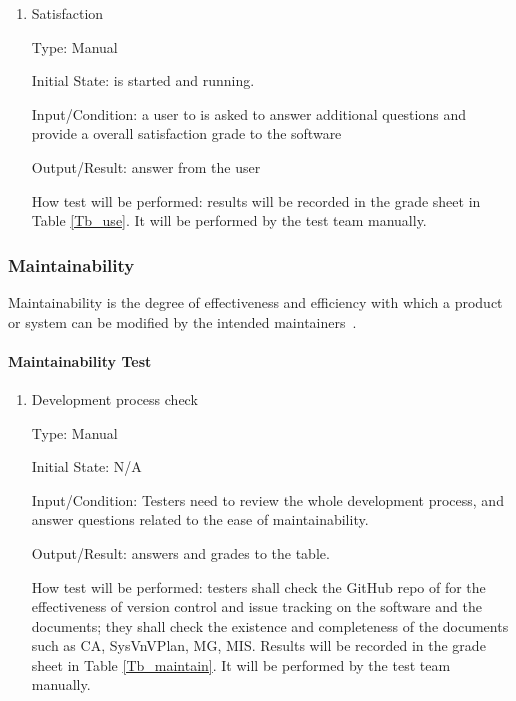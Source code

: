 \documentclass[12pt, titlepage]{article}
\begin{document}
\begin{enumerate}
\item{Satisfaction}

Type: Manual
					
Initial State: \progname{} is started and running.
					
Input/Condition: a user to \progname{} is asked to answer additional questions and provide a overall satisfaction grade to the software 
					
Output/Result: answer from the user
					
How test will be performed: results will be recorded in the grade sheet in Table \ref{Tb_use}. It will be performed by the test team manually.

\end{enumerate}

\subsubsection{Maintainability}
\label{sec_Maintaintest}
Maintainability is the degree of effectiveness and efficiency with which a product or system can be modified by the intended maintainers~\cite{ISO/IEC25010:2011}.

\paragraph{Maintainability Test}

\begin{enumerate}

\item{Development process check}

Type: Manual
					
Initial State: N/A
					
Input/Condition: Testers need to review the whole development process, and answer questions related to the ease of maintainability.
					
Output/Result: answers and grades to the table.
					
How test will be performed: testers shall check the GitHub repo of \progname{} for the effectiveness of version control and issue tracking on the software and the documents; they shall check the existence and completeness of the documents such as CA, SysVnVPlan, MG, MIS. Results will be recorded in the grade sheet in Table \ref{Tb_maintain}. It will be performed by the test team manually.	
\end{enumerate}
\end{document}
